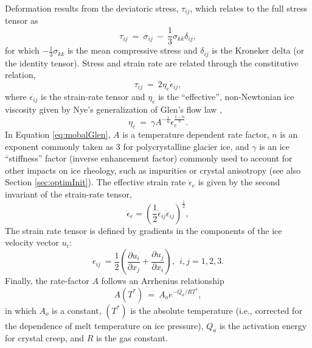Deformation results from the deviatoric stress, $\tau_{ ij}$, which relates to the full stress tensor as
\begin{equation}
\tau_{ ij} ~ = ~ \sigma _{ ij} ~ - ~{\frac{ 1}{ 3}} \sigma _{ kk} \delta _{ ij},
\label{eq:mobaldevia}
\end{equation}
\noindent
for which ${-\frac{1}{ 3}} \sigma _{ kk}$ is the mean compressive stress and $\delta_{ ij}$ is the Kroneker delta (or the identity tensor). 
Stress and strain rate are related through the constitutive relation,
\begin{equation}
\tau_{ij}~=~2 \eta_{e} \dot{\epsilon}_{ij},
\label{eq:tauij}
\end{equation}
where $\dot{\epsilon_{ij}}$ is the strain-rate tensor and $\eta_{e}$ is the ``effective'', non-Newtonian ice viscosity given by Nye's generalization of Glen's flow law \citep{Glen1955}, 
\begin{equation}
\eta_{e}~=~\gamma A^{-\frac{1}{n}} \dot{\epsilon}_{e}^{\frac{1-n}{n}}.
\label{eq:mobalGlen}
\end{equation}
In Equation \ref{eq:mobalGlen}, $A$ is a temperature dependent rate factor, $n$ is an exponent commonly taken as 3 for polycrystalline glacier ice, and $\gamma$ is an ice ``stiffness'' factor (inverse enhancement factor) commonly used to account for other impacts on ice rheology, such as impurities or crystal anisotropy (see also Section \ref{sec:optimInit}). The effective strain rate $\dot{\epsilon}_{e}$  is given by the second invariant of the strain-rate tensor,
\begin{equation}
\dot{\epsilon}_{e}=\left(\frac{1}{2}\dot{\epsilon}_{ij}\dot{\epsilon}_{ij}\right)^{\frac{1}{2}},
\label{eq:effstrain}
\end{equation}
The strain rate tensor is defined by gradients in the components of the ice velocity vector $u_i$:
\begin{equation}
\dot{\epsilon}_{ij}~= \frac{1}{2}\left( \frac{ \partial u_{i}}{\partial x_{j}} + \frac{ \partial u_{j}}{\partial x_{i}}\right), ~~i,j = 1,2,3.
\label{eq:mobalstrainrate}
\end{equation}
Finally, the rate-factor $A$ follows an Arrhenius relationship
\begin{equation}
A\left( T^{*}\right)~=~A_{o}e^{-Q_a/RT^{*}},
\label{eq:mobalA}
\end{equation}
\noindent
in which $A_{o}$ is a constant, $(T^{*})$ is the absolute temperature (i.e., corrected for the dependence of melt temperature on ice pressure),
$Q_a$ is the activation energy for crystal creep, and $R$ is the gas constant.

